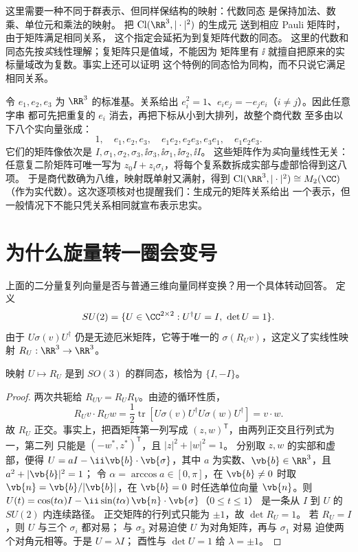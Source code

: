 这里需要一种不同于群表示、但同样保结构的映射：代数同态
是保持加法、数乘、单位元和乘法的映射。
把 \(\operatorname{Cl}(\RR^3,|\cdot|^2)\) 的生成元
送到相应 Pauli 矩阵时，由于矩阵满足相同关系，
这个指定会延拓为到复矩阵代数的同态。
这里的代数和同态先按\emph{实}线性理解；复矩阵只是值域，不能因为
矩阵里有 \(\ii\) 就擅自把原来的实标量域改为复数。事实上还可以证明
这个特例的同态恰为同构，而不只说它满足相同关系。

令 \(e_1,e_2,e_3\) 为 \(\RR^3\) 的标准基。关系给出
\(e_i^2=1\)、\(e_ie_j=-e_je_i\)（\(i\ne j\)）。因此任意字串
都可先把重复的 \(e_i\) 消去，再把下标从小到大排列，故整个商代数
至多由以下八个实向量张成：
\[
1,\quad e_1,e_2,e_3,\quad e_1e_2,e_2e_3,e_3e_1,
\quad e_1e_2e_3.
\]
它们的矩阵像依次是
\(I,\sigma_1,\sigma_2,\sigma_3,
\ii\sigma_3,\ii\sigma_1,\ii\sigma_2,\ii I\)。
这些矩阵作为\emph{实}向量线性无关：任意复二阶矩阵可唯一写为
\(z_0I+z_i\sigma_i\)，将每个复系数拆成实部与虚部恰得到这八项。
于是商代数确为八维，映射既单射又满射，得到
\(\operatorname{Cl}(\RR^3,|\cdot|^2)\cong M_2(\CC)\)
（作为实代数）。这次逐项核对也提醒我们：生成元的矩阵关系给出
一个表示，但一般情况下不能只凭关系相同就宣布表示忠实。

\section{为什么旋量转一圈会变号}

上面的二分量复列向量是否与普通三维向量同样变换？用一个具体转动回答。
定义
\[
SU(2)=\{U\in\CC^{2\times2}:U^\dagger U=I,\ \det U=1\}.
\]
由于 \(U\sigma(v)U^\dagger\) 仍是无迹厄米矩阵，它等于唯一的
\(\sigma(R_Uv)\)，这定义了实线性映射 \(R_U:\RR^3\to\RR^3\)。

\begin{proposition}[从二分量矩阵到空间转动]
映射 \(U\mapsto R_U\) 是到 \(SO(3)\) 的群同态，核恰为 \(\{I,-I\}\)。
\end{proposition}
\begin{proof}
两次共轭给 \(R_{UV}=R_UR_V\)。由迹的循环性质，
\[
R_Uv\cdot R_Uw
=\frac12\operatorname{tr}[U\sigma(v)U^\dagger
U\sigma(w)U^\dagger]
=v\cdot w.
\]
故 \(R_U\) 正交。事实上，把酉矩阵第一列写成
\((z,w)^{\mathsf T}\)，由两列正交且行列式为一，第二列
只能是 \((-w^*,z^*)^{\mathsf T}\)，且 \(|z|^2+|w|^2=1\)。
分别取 \(z,w\) 的实部和虚部，便得
\(U=aI-\ii\vb{b}\cdot\vb{\sigma}\)，其中
\(a\) 为实数、\(\vb{b}\in\RR^3\)，且 \(a^2+|\vb{b}|^2=1\)；
令 \(\alpha=\arccos a\in[0,\pi]\)，在 \(\vb{b}\ne0\) 时取
\(\vb{n}=\vb{b}/|\vb{b}|\)，在 \(\vb{b}=0\) 时任选单位向量
\(\vb{n}\)。则
\(U(t)=\cos(t\alpha)I-\ii\sin(t\alpha)\,
\vb{n}\cdot\vb{\sigma}\)（\(0\leq t\leq1\)）
是一条从 \(I\) 到 \(U\) 的 \(SU(2)\) 内连续路径。
正交矩阵的行列式只能为 \(\pm1\)，故 \(\det R_U=1\)。
若 \(R_U=I\)，则 \(U\) 与三个 \(\sigma_i\) 都对易；
与 \(\sigma_3\) 对易迫使 \(U\) 为对角矩阵，再与 \(\sigma_1\) 对易
迫使两个对角元相等。于是 \(U=\lambda I\)；
酉性与 \(\det U=1\) 给 \(\lambda=\pm1\)。
\end{proof}

